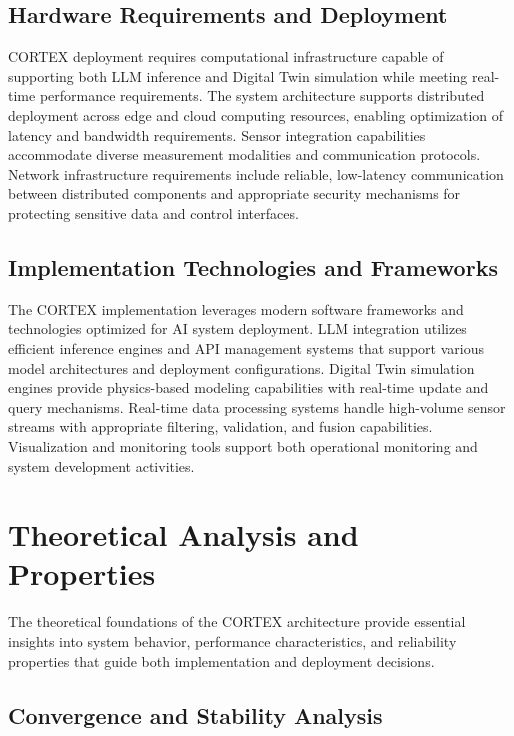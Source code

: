 \subsection{Hardware Requirements and Deployment}

CORTEX deployment requires computational infrastructure capable of supporting both LLM inference and Digital Twin simulation while meeting real-time performance requirements. The system architecture supports distributed deployment across edge and cloud computing resources, enabling optimization of latency and bandwidth requirements. Sensor integration capabilities accommodate diverse measurement modalities and communication protocols. Network infrastructure requirements include reliable, low-latency communication between distributed components and appropriate security mechanisms for protecting sensitive data and control interfaces.

\subsection{Implementation Technologies and Frameworks}

The CORTEX implementation leverages modern software frameworks and technologies optimized for AI system deployment. LLM integration utilizes efficient inference engines and API management systems that support various model architectures and deployment configurations. Digital Twin simulation engines provide physics-based modeling capabilities with real-time update and query mechanisms. Real-time data processing systems handle high-volume sensor streams with appropriate filtering, validation, and fusion capabilities. Visualization and monitoring tools support both operational monitoring and system development activities.

\section{Theoretical Analysis and Properties}

The theoretical foundations of the CORTEX architecture provide essential insights into system behavior, performance characteristics, and reliability properties that guide both implementation and deployment decisions.

\subsection{Convergence and Stability Analysis}

